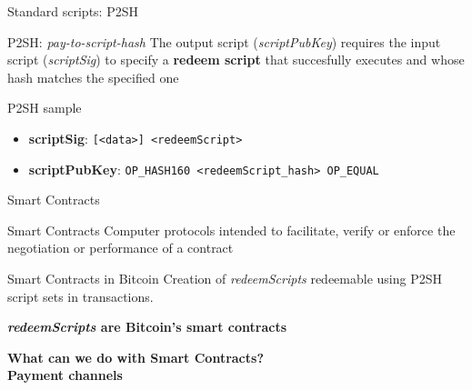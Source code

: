 \documentclass{beamer}
\begin{document}
\begin{frame}{Standard scripts: P2SH}
 \begin{block}{P2SH: \textit{pay-to-script-hash}}
  The output script (\textit{scriptPubKey}) requires the input script (\textit{scriptSig}) to specify a \textbf{redeem script} that succesfully executes and whose hash matches the specified one
 \end{block}
 \begin{exampleblock}{P2SH sample}
  \begin{itemize}
   \item \textbf{scriptSig}: \texttt{[<data>] <redeemScript>}
   \item \textbf{scriptPubKey}: \texttt{OP\_HASH160 <redeemScript\_hash> OP\_EQUAL}
  \end{itemize}
 \end{exampleblock}
\end{frame}
\begin{frame}{Smart Contracts}
 \begin{block}{Smart Contracts}
  Computer protocols intended to facilitate, verify or enforce the negotiation or performance of a contract
 \end{block}
 \begin{block}{Smart Contracts in Bitcoin}
  Creation of \textit{redeemScripts} redeemable using P2SH script sets in transactions.
  \begin{center}
   \textbf{\textit{redeemScripts} are Bitcoin's smart contracts}
  \end{center}
 \end{block}
\end{frame}
\begin{frame}
 \begin{center}
  \textbf{What can we do with Smart Contracts?}\\
  \huge\textbf{Payment channels}
 \end{center}
\end{frame}
\end{document}
